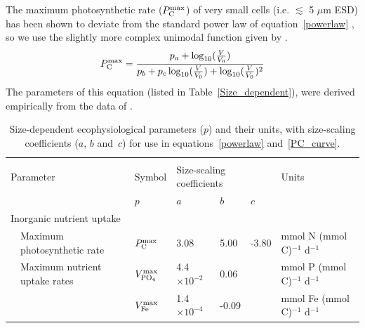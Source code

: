 \documentclass[gmd, manuscript]{copernicus}
\begin{document}
The maximum photosynthetic rate ($P^{\rm max}_{\rm C}$) of very small cells (i.e. $\lesssim$ 5 $\mu$m ESD) has been shown to deviate from the standard power law of equation~\ref{powerlaw} \citep{Raven:1994,Bec:2008,Finkel:2010}, so we use the slightly more complex unimodal function given by \citet{Ward:2016}.
%
\begin{equation}
\label{PC_curve}
P^{\rm max}_{\rm C} = \frac{p_a + \log_{10}(\frac{V}{V_0})}{p_b + p_c \log_{10}(\frac{V}{V_0})+ \log_{10}(\frac{V}{V_0})^2}
\end{equation}
%
The parameters of this equation (listed in Table~\ref{Size_dependent}), were derived empirically from the data of \citet{Maranon:2013}.

\begin{table}[htp!]
\footnotesize
\caption{Size-dependent ecophysiological parameters ($p$) and their units, with size-scaling coefficients ($a$, $b$ and~$c$) for use in equations~\ref{powerlaw} and~\ref{PC_curve}.}
\begin{tabular*}{1.0\textwidth}{@{\extracolsep{\fill}}lllllll}
\hline \\ [-2ex]
\multicolumn{2}{l}{Parameter} & Symbol & \multicolumn{3}{l}{Size-scaling coefficients} & Units \\ 
& & $p$ & $a$ & $b$ & $c$ & \\ 
\multicolumn{7}{l}{{Inorganic nutrient uptake}}\\ 
& Maximum photosynthetic rate & $P^{\rm max}_{\rm C}$ & 3.08 & 5.00 & -3.80 & mmol N (mmol C)$^{-1}$ d$^{-1}$ \\ 
& Maximum nutrient uptake rates  & $V^{\rm max}_{\rm PO_4}$ & 4.4$\times10^{-2}$ & 0.06 & & mmol P (mmol C)$^{-1}$ d$^{-1}$ \\ 
& & $V^{\rm max}_{\rm Fe}$ & 1.4$\times10^{-4}$ & -0.09 & & mmol Fe (mmol C)$^{-1}$ d$^{-1}$ \\ 

\end{tabular*}
\end{table}
\end{document}
